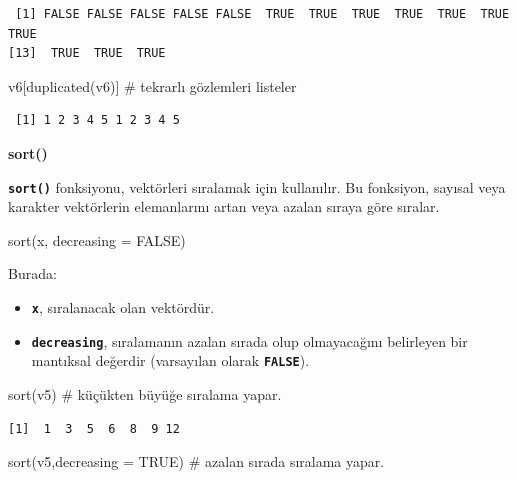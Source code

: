 \documentclass[
  letterpaper,
  DIV=11,
  numbers=noendperiod]{scrreprt}
\newenvironment{Shaded}{\begin{snugshade}}{\end{snugshade}}
\newcommand{\AttributeTok}[1]{\textcolor[rgb]{0.40,0.45,0.13}{#1}}
\newcommand{\CommentTok}[1]{\textcolor[rgb]{0.37,0.37,0.37}{#1}}
\newcommand{\ConstantTok}[1]{\textcolor[rgb]{0.56,0.35,0.01}{#1}}
\newcommand{\FunctionTok}[1]{\textcolor[rgb]{0.28,0.35,0.67}{#1}}
\newcommand{\NormalTok}[1]{\textcolor[rgb]{0.00,0.23,0.31}{#1}}
\begin{document}
\begin{verbatim}
 [1] FALSE FALSE FALSE FALSE FALSE  TRUE  TRUE  TRUE  TRUE  TRUE  TRUE  TRUE
[13]  TRUE  TRUE  TRUE
\end{verbatim}

\begin{Shaded}
\begin{Highlighting}[]
\NormalTok{v6[}\FunctionTok{duplicated}\NormalTok{(v6)] }\CommentTok{\# tekrarlı gözlemleri listeler}
\end{Highlighting}
\end{Shaded}

\begin{verbatim}
 [1] 1 2 3 4 5 1 2 3 4 5
\end{verbatim}

\textbf{sort()}

\textbf{\texttt{sort()}} fonksiyonu, vektörleri sıralamak için
kullanılır. Bu fonksiyon, sayısal veya karakter vektörlerin elemanlarını
artan veya azalan sıraya göre sıralar.

\begin{Shaded}
\begin{Highlighting}[]
\FunctionTok{sort}\NormalTok{(x, }\AttributeTok{decreasing =} \ConstantTok{FALSE}\NormalTok{)}
\end{Highlighting}
\end{Shaded}

Burada:

\begin{itemize}
\item
  \textbf{\texttt{x}}, sıralanacak olan vektördür.
\item
  \textbf{\texttt{decreasing}}, sıralamanın azalan sırada olup
  olmayacağını belirleyen bir mantıksal değerdir (varsayılan olarak
  \textbf{\texttt{FALSE}}).
\end{itemize}

\begin{Shaded}
\begin{Highlighting}[]
\FunctionTok{sort}\NormalTok{(v5) }\CommentTok{\# küçükten büyüğe sıralama yapar.}
\end{Highlighting}
\end{Shaded}

\begin{verbatim}
[1]  1  3  5  6  8  9 12
\end{verbatim}

\begin{Shaded}
\begin{Highlighting}[]
\FunctionTok{sort}\NormalTok{(v5,}\AttributeTok{decreasing =} \ConstantTok{TRUE}\NormalTok{) }\CommentTok{\# azalan sırada sıralama yapar.}
\end{Highlighting}
\end{Shaded}
\end{document}
